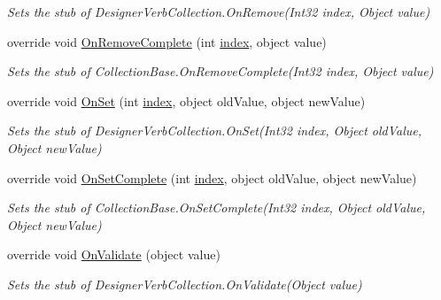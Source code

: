 \begin{DoxyCompactItemize}
\begin{DoxyCompactList}\small\item\em Sets the stub of Designer\-Verb\-Collection.\-On\-Remove(\-Int32 index, Object value)\end{DoxyCompactList}\item 
override void \hyperlink{class_system_1_1_component_model_1_1_design_1_1_fakes_1_1_stub_designer_verb_collection_af029be18f35af4296bf209fba8ff972b}{On\-Remove\-Complete} (int \hyperlink{jquery-1_810_82-vsdoc_8js_a75bb12d1f23302a9eea93a6d89d0193e}{index}, object value)
\begin{DoxyCompactList}\small\item\em Sets the stub of Collection\-Base.\-On\-Remove\-Complete(\-Int32 index, Object value)\end{DoxyCompactList}\item 
override void \hyperlink{class_system_1_1_component_model_1_1_design_1_1_fakes_1_1_stub_designer_verb_collection_a6b4c28932292e8b55fe7a2127b76856d}{On\-Set} (int \hyperlink{jquery-1_810_82-vsdoc_8js_a75bb12d1f23302a9eea93a6d89d0193e}{index}, object old\-Value, object new\-Value)
\begin{DoxyCompactList}\small\item\em Sets the stub of Designer\-Verb\-Collection.\-On\-Set(\-Int32 index, Object old\-Value, Object new\-Value)\end{DoxyCompactList}\item 
override void \hyperlink{class_system_1_1_component_model_1_1_design_1_1_fakes_1_1_stub_designer_verb_collection_a77380b38dadc7b0b20090840e5c858c8}{On\-Set\-Complete} (int \hyperlink{jquery-1_810_82-vsdoc_8js_a75bb12d1f23302a9eea93a6d89d0193e}{index}, object old\-Value, object new\-Value)
\begin{DoxyCompactList}\small\item\em Sets the stub of Collection\-Base.\-On\-Set\-Complete(\-Int32 index, Object old\-Value, Object new\-Value)\end{DoxyCompactList}\item 
override void \hyperlink{class_system_1_1_component_model_1_1_design_1_1_fakes_1_1_stub_designer_verb_collection_a62cb5198566eacf713e18506873e0a12}{On\-Validate} (object value)
\begin{DoxyCompactList}\small\item\em Sets the stub of Designer\-Verb\-Collection.\-On\-Validate(\-Object value)\end{DoxyCompactList}\end{DoxyCompactItemize}

